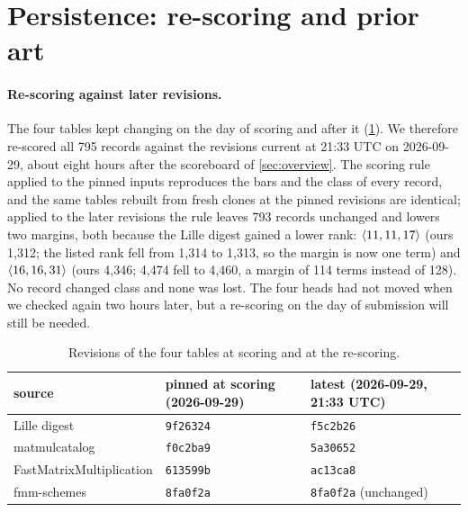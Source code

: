 \section{Persistence: re-scoring and prior art}\label{sec:persistence}

\paragraph{Re-scoring against later revisions.}
The four tables kept changing on the day of scoring and after it (\cref{tab:rescore}). We therefore re-scored all 795 records against the revisions current at 21:33 UTC on 2026-09-29, about eight hours after the scoreboard of \cref{sec:overview}.
The scoring rule applied to the pinned inputs reproduces the bars and the class of every record, and the same tables rebuilt from fresh clones at the pinned revisions are identical; applied to the later revisions the rule leaves 793 records unchanged and lowers two margins, both because the Lille digest gained a lower rank:
$\langle 11,11,17\rangle$ (ours 1{,}312; the listed rank fell from 1{,}314 to 1{,}313, so the margin is now one term) and $\langle 16,16,31\rangle$ (ours 4{,}346; 4{,}474 fell to 4{,}460, a margin of 114 terms instead of 128).
No record changed class and none was lost. The four heads had not moved when we checked again two hours later, but a re-scoring on the day of submission will still be needed.
\begin{table}[t]
\centering\small
\begin{tabular}{@{}lll@{}}
\toprule
source & pinned at scoring (2026-09-29) & latest (2026-09-29, 21:33 UTC)\\
\midrule
Lille digest & \texttt{9f26324} & \texttt{f5c2b26}\\
matmulcatalog & \texttt{f0c2ba9} & \texttt{5a30652}\\
FastMatrixMultiplication & \texttt{613599b} & \texttt{ac13ca8}\\
fmm-schemes & \texttt{8fa0f2a} & \texttt{8fa0f2a} (unchanged)\\
\bottomrule
\end{tabular}
\caption{Revisions of the four tables at scoring and at the re-scoring.}
\label{tab:rescore}
\end{table}

